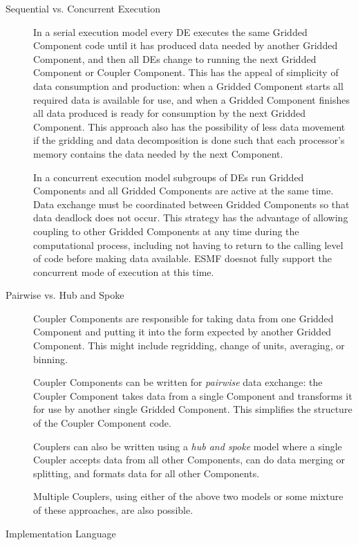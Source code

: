 \begin{description}

\item[Sequential vs. Concurrent Execution]

In a serial execution model every DE executes the same Gridded 
Component code until it has produced data needed by another 
Gridded Component, and then all DEs change to running the next 
Gridded Component or Coupler Component.  This has the appeal of 
simplicity of data consumption and production: when a Gridded 
Component starts all required data is available for use, and when 
a Gridded Component finishes all data produced is ready for consumption 
by the next Gridded Component.  This approach also has
the possibility of less data movement if the gridding and
data decomposition is done such that each processor's memory contains
the data needed by the next Component.

In a concurrent execution model subgroups of DEs run
Gridded Components and all Gridded Components are active at the 
same time.  Data exchange must be coordinated between Gridded 
Components so that data deadlock does not occur.  This strategy 
has the advantage of allowing coupling to other Gridded Components 
at any time during the computational process, including not 
having to return to the calling level of code before making 
data available.  ESMF doesnot fully support the concurrent mode
of execution at this time.

\item[Pairwise vs. Hub and Spoke]

Coupler Components are responsible for taking data from one
Gridded Component and putting it into the form expected by another 
Gridded Component.  This might include regridding, change of units, 
averaging, or binning.

Coupler Components can be written for {\it pairwise} data exchange: 
the Coupler Component takes data from a single Component and transforms 
it for use by another single Gridded Component.  This simplifies the 
structure of the Coupler Component code.

Couplers can also be written using a {\it hub and spoke} model where a
single Coupler accepts data from all other Components, can do data
merging or splitting, and formats data for all other Components.

Multiple Couplers, using either of the above two models or some mixture of
these approaches, are also possible.

\item[Implementation Language]


\end{description}
